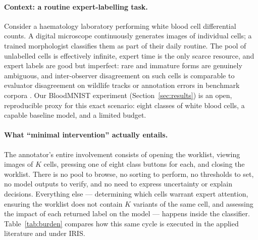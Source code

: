 \documentclass[a4paper,fleqn,longmktitle]{cas-sc}
\newcommand{\method}{IRIS}
\begin{document}
\paragraph{Context: a routine expert-labelling task.} Consider a
haematology laboratory performing white blood cell differential counts.
A digital microscope continuously generates images of individual cells;
a trained morphologist classifies them as part of their daily routine.
The pool of unlabelled cells is effectively infinite, expert time is
the only scarce resource, and expert labels are good but imperfect:
rare and immature forms are genuinely ambiguous, and inter-observer
disagreement on such cells is comparable to evaluator disagreement on
wildlife tracks \citep{petso2026} or annotation errors in benchmark
corpora \citep{hussain2026}. Our BloodMNIST experiment
(Section~\ref{sec:results}) is an open, reproducible proxy for this
exact scenario: eight classes of white blood cells, a capable baseline
model, and a limited budget.

\paragraph{What ``minimal intervention'' actually entails.} The
annotator's entire involvement consists of opening the worklist,
viewing images of $K$ cells, pressing one of eight class buttons for
each, and closing the worklist. There is no pool to browse, no sorting
to perform, no thresholds to set, no model outputs to verify, and no
need to express uncertainty or explain decisions. Everything else ---
determining which cells warrant expert attention, ensuring the worklist
does not contain $K$ variants of the same cell, and assessing the
impact of each returned label on the model --- happens inside the
classifier. Table~\ref{tab:burden} compares how this same cycle is
executed in the applied literature and under \method{}.
\end{document}
